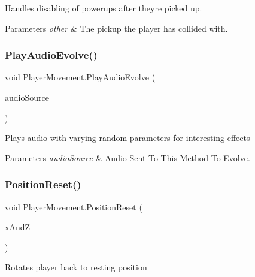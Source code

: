 Handles disabling of powerups after they\textquotesingle{}re picked up. 
\begin{DoxyParams}{Parameters}
{\em other} & The pickup the player has collided with.\\
\hline
\end{DoxyParams}


\mbox{\label{class_player_movement_afec8bf4f997d2c43559fe0069870bcb1}} 
\subsubsection{\texorpdfstring{Play\+Audio\+Evolve()}{PlayAudioEvolve()}}
{\footnotesize\ttfamily void Player\+Movement.\+Play\+Audio\+Evolve (\begin{DoxyParamCaption}\item[{Audio\+Source}]{audio\+Source }\end{DoxyParamCaption})\hspace{0.3cm}{\ttfamily [private]}}



Plays audio with varying random parameters for interesting effects 
\begin{DoxyParams}{Parameters}
{\em audio\+Source} & Audio Sent To This Method To Evolve.\\
\hline
\end{DoxyParams}


\mbox{\label{class_player_movement_a0f28741d3452090520ee11352140aed0}} 
\subsubsection{\texorpdfstring{Position\+Reset()}{PositionReset()}}
{\footnotesize\ttfamily void Player\+Movement.\+Position\+Reset (\begin{DoxyParamCaption}\item[{int}]{x\+AndZ }\end{DoxyParamCaption})}



Rotates player back to resting position 

